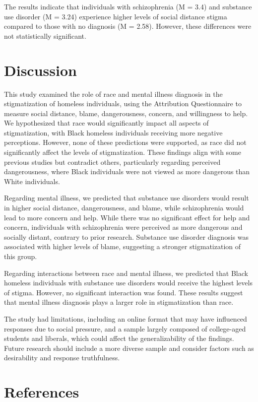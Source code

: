 \documentclass[
  man,
  floatsintext,
  longtable,
  nolmodern,
  notxfonts,
  notimes,
  colorlinks=true,linkcolor=blue,citecolor=blue,urlcolor=blue]{apa7}
\begin{document}
The results indicate that individuals with schizophrenia (M = 3.4) and
substance use disorder (M = 3.24) experience higher levels of social
distance stigma compared to those with no diagnosis (M = 2.58). However,
these differences were not statistically significant.

\section{Discussion}\label{discussion}

This study examined the role of race and mental illness diagnosis in the
stigmatization of homeless individuals, using the Attribution
Questionnaire to measure social distance, blame, dangerousness, concern,
and willingness to help. We hypothesized that race would significantly
impact all aspects of stigmatization, with Black homeless individuals
receiving more negative perceptions. However, none of these predictions
were supported, as race did not significantly affect the levels of
stigmatization. These findings align with some previous studies but
contradict others, particularly regarding perceived dangerousness, where
Black individuals were not viewed as more dangerous than White
individuals.

Regarding mental illness, we predicted that substance use disorders
would result in higher social distance, dangerousness, and blame, while
schizophrenia would lead to more concern and help. While there was no
significant effect for help and concern, individuals with schizophrenia
were perceived as more dangerous and socially distant, contrary to prior
research. Substance use disorder diagnosis was associated with higher
levels of blame, suggesting a stronger stigmatization of this group.

Regarding interactions between race and mental illness, we predicted
that Black homeless individuals with substance use disorders would
receive the highest levels of stigma. However, no significant
interaction was found. These results suggest that mental illness
diagnosis plays a larger role in stigmatization than race.

The study had limitations, including an online format that may have
influenced responses due to social pressure, and a sample largely
composed of college-aged students and liberals, which could affect the
generalizability of the findings. Future research should include a more
diverse sample and consider factors such as desirability and response
truthfulness.

\section{References}\label{references}
\end{document}
